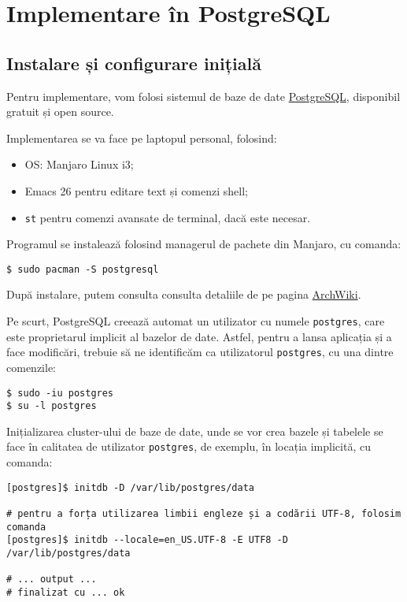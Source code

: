 
\chapter{Implementare în PostgreSQL}

\section{Instalare și configurare inițială}

Pentru implementare, vom folosi sistemul de baze de date
\href{https://www.postgresql.org/}{PostgreSQL}, disponibil gratuit și
open source.

Implementarea se va face pe laptopul personal, folosind:
\begin{itemize}
\item OS: Manjaro Linux i3;
\item Emacs 26 pentru editare text și comenzi shell;
\item \texttt{st} pentru comenzi avansate de terminal, dacă este necesar.
\end{itemize}

Programul se instalează folosind managerul de pachete din Manjaro,
cu comanda:
{
  \small
\begin{verbatim}
$ sudo pacman -S postgresql
\end{verbatim}
}

După instalare, putem consulta consulta detaliile de pe pagina
\href{https://wiki.archlinux.org/index.php/PostgreSQL\#Create\_your\_first\_database/user}{ArchWiki}.

Pe scurt, PostgreSQL creează automat un utilizator cu numele \texttt{postgres},
care este proprietarul implicit al bazelor de date. Astfel, pentru a lansa
aplicația și a face modificări, trebuie să ne identificăm ca utilizatorul \texttt{postgres},
cu una dintre comenzile:

{
  \small
\begin{verbatim}
$ sudo -iu postgres
$ su -l postgres
\end{verbatim}
}

Inițializarea cluster-ului de baze de date, unde se vor crea bazele și tabelele
se face în calitatea de utilizator \texttt{postgres}, de exemplu, în locația
implicită, cu comanda:

{
  \small
\begin{verbatim}
[postgres]$ initdb -D /var/lib/postgres/data

# pentru a forța utilizarea limbii engleze și a codării UTF-8, folosim comanda
[postgres]$ initdb --locale=en_US.UTF-8 -E UTF8 -D /var/lib/postgres/data

# ... output ...
# finalizat cu ... ok
\end{verbatim}
}

